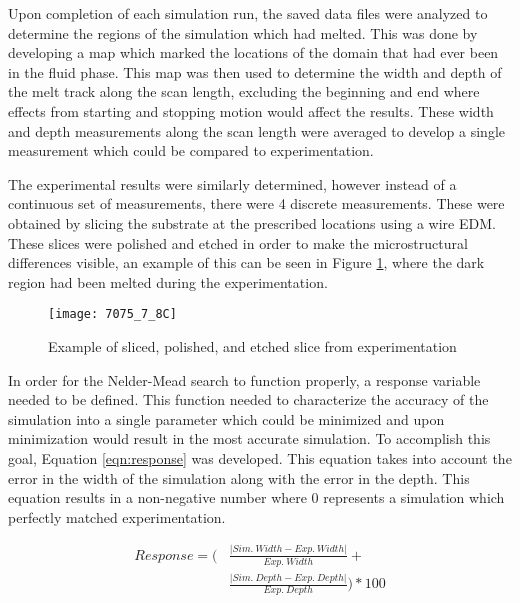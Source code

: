 \label{sim_analysis}

Upon completion of each simulation run, the saved data files were analyzed to determine the regions of the simulation which had melted.  This was done by developing a map which marked the locations of the domain that had ever been in the fluid phase.  This map was then used to determine the width and depth of the melt track along the scan length, excluding the beginning and end where effects from starting and stopping motion would affect the results.  These width and depth measurements along the scan length were averaged to develop a single measurement which could be compared to experimentation.  

The experimental results were similarly determined, however instead of a continuous set of measurements, there were 4 discrete measurements.  These were obtained by slicing the substrate at the prescribed locations using a wire \ac{EDM}.  These slices were polished and etched in order to make the microstructural differences visible, an example of this can be seen in Figure \ref{fig:7075_7_8C}, where the dark region had been melted during the experimentation.
\begin{figure}[!htb]
	\centering
	\texttt{[image: 7075\_7\_8C]}
	\caption{Example of sliced, polished, and etched slice from experimentation}
	\label{fig:7075_7_8C}
\end{figure}

In order for the Nelder-Mead search to function properly, a response variable needed to be defined.  This function needed to characterize the accuracy of the simulation into a single parameter which could be minimized and upon minimization would result in the most accurate simulation.  To accomplish this goal, Equation \ref{eqn:response} was developed.  This equation takes into account the error in the width of the simulation along with the error in the depth.  This equation results in a non-negative number where 0 represents a simulation which perfectly matched experimentation.

\begin{equation}\label{eqn:response}
	\begin{split}
		Response =  \Biggl ( &\frac{\lvert Sim.\ Width - Exp.\ Width \rvert}{Exp.\ Width} + \\ 
		&\frac{\lvert Sim.\ Depth - Exp.\ Depth \rvert}{Exp.\ Depth} \Biggr ) * 100
	\end{split}
\end{equation}